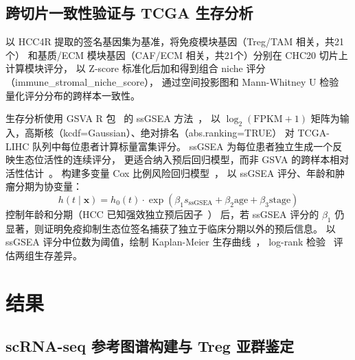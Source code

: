 \documentclass[12pt, a4paper]{ctexart}
\begin{document}
\subsection{跨切片一致性验证与 TCGA 生存分析}

以 HCC4R 提取的签名基因集为基准，将免疫模块基因（Treg/TAM 相关，共21个）
和基质/ECM 模块基因（CAF/ECM 相关，共21个）分别在 CHC20 切片上计算模块评分，
以 Z-score 标准化后加和得到组合 niche 评分（immune\_stromal\_niche\_score），
通过空间投影图和 Mann-Whitney U 检验~\citep{mann1947test}
量化评分分布的跨样本一致性。

生存分析使用 GSVA R 包~\citep{hanzelmann2013gsva} 的 ssGSEA 方法~\citep{barbie2009systematic}，
以 $\log_2(\text{FPKM}+1)$ 矩阵为输入，高斯核（kcdf=Gaussian）、绝对排名（abs.ranking=TRUE）
对 TCGA-LIHC 队列中每位患者计算标量富集评分。
ssGSEA 为每位患者独立生成一个反映生态位活性的连续评分，
更适合纳入预后回归模型，而非 GSVA 的跨样本相对活性估计~\citep{barbie2009systematic}。
构建多变量 Cox 比例风险回归模型~\citep{cox1972regression}，
以 ssGSEA 评分、年龄和肿瘤分期为协变量：
\begin{equation*}
h(t \mid \mathbf{x}) = h_0(t) \cdot \exp(\beta_1 s_{\text{ssGSEA}} + \beta_2 \text{age} + \beta_3 \text{stage})
\label{eq:cox}
\end{equation*}
控制年龄和分期（HCC 已知强效独立预后因子~\citep{llovet2021hepatocellular}）
后，若 ssGSEA 评分的 $\beta_1$ 仍显著，则证明免疫抑制生态位签名捕获了独立于临床分期以外的预后信息。
以 ssGSEA 评分中位数为阈值，绘制 Kaplan-Meier 生存曲线~\citep{kaplan1958nonparametric}，
log-rank 检验~\citep{mantel1966evaluation} 评估两组生存差异。


\section{结果}

\subsection{scRNA-seq 参考图谱构建与 Treg 亚群鉴定}
\end{document}
